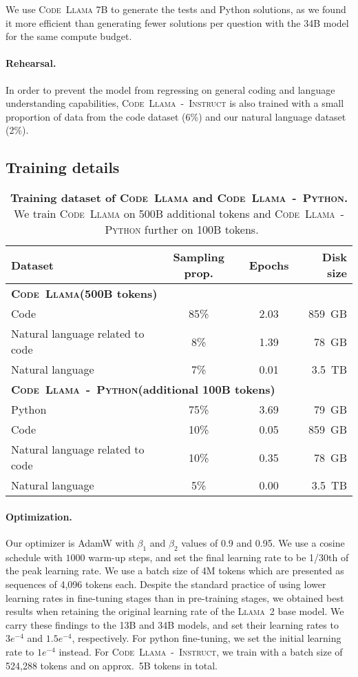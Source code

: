 \documentclass[10pt]{article}
\newcommand{\model}{\textsc{Code~Llama}\xspace}
\newcommand{\instmodel}{\textsc{Code~Llama~-~Instruct}\xspace}
\newcommand{\pymodel}{\textsc{Code~Llama~-~Python}\xspace}
\newcommand{\llamavtwo}{\textsc{Llama~2}\xspace}
\begin{document}
We use \model 7B to generate the tests and Python solutions, as we found it more efficient than generating fewer solutions per question with the 34B model for the same compute budget. 

\paragraph{Rehearsal.}
In order to prevent the model from regressing on general coding and language understanding capabilities, \instmodel is also trained with a small proportion of data from the code dataset (6\%) and our natural language dataset (2\%). 


\subsection{Training details}
\begin{table}[t]
    \centering
    \setlength{\tabcolsep}{3pt}
    \begin{tabular}{@{}l@{}ccr@{}}
    \toprule
  Dataset &  Sampling prop. & Epochs &  Disk size \\  \midrule
\multicolumn{4}{l}{\textbf{\model (500B tokens)}} \\ 
  Code     & 85\%  & 2.03 & 859~GB \\
  Natural language related to code             & 8\%  & 1.39 & 78~GB \\
  Natural language    & 7\%  & 0.01 & 3.5~TB \\
  \midrule
\multicolumn{4}{l}{\textbf{\pymodel (additional 100B tokens)}} \\ 
  Python & 75\% & 3.69 & 79~GB\\ 
  Code    & 10\%  & 0.05 & 859~GB \\
  Natural language related to code & 10\%  & 0.35 & 78~GB \\
  Natural language    & 5\%  & 0.00 & 3.5~TB \\
  \bottomrule  
    \end{tabular}    
    \caption{\textbf{Training dataset of \model and \pymodel.} We train \model on 500B additional tokens and \pymodel further on 100B tokens.
    \label{tab:dataset}}
\end{table}

\paragraph{Optimization.}
Our optimizer is AdamW \citep{loshchilov2019decoupled} with $\beta_1$ and $\beta_2$ values of 0.9 and 0.95. We use a cosine schedule with $1000$ warm-up steps, and set the final learning rate to be 1/30th of the peak learning rate. 
We use a batch size of 4M tokens which are presented as sequences of 4,096 tokens each. 
Despite the standard practice of using lower learning rates in fine-tuning stages than in pre-training stages, we obtained best results when retaining the original learning rate of the \llamavtwo base model. We carry these findings to the 13B and 34B models, and set their learning rates to $3e^{-4}$ and $1.5e^{-4}$, respectively.
For python fine-tuning, we set the initial learning rate to $1e^{-4}$ instead.
For \instmodel, we train with a batch size of 524,288 tokens and on approx.\ 5B tokens in total. 
\end{document}
